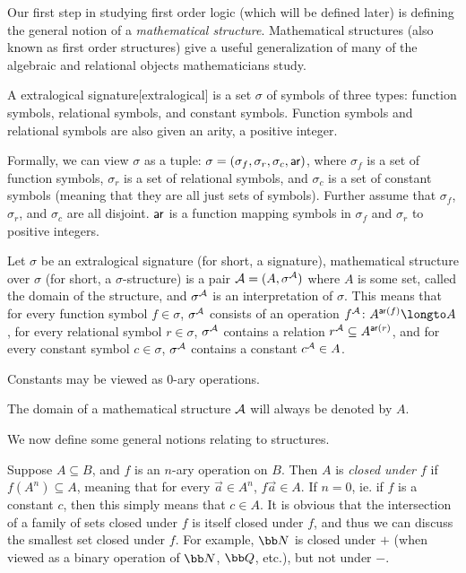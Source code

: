 Our first step in studying first order logic (which will be defined later) is defining the general notion of a {\it mathematical structure}.
Mathematical structures (also known as first order structures) give a useful generalization of many of the algebraic and relational objects mathematicians study.

\bdefn

    A {\emphcolor extralogical signature}[extralogical] is a set $\sigma$ of symbols of three types: function symbols, relational symbols, and constant symbols.
    Function symbols and relational symbols are also given an {\emphcolor arity}, a positive integer.

    Formally, we can view $\sigma$ as a tuple: $\sigma=(\sigma_f,\sigma_r,\sigma_c,{\sf ar})$, where $\sigma_f$ is a set of function symbols, $\sigma_r$ is a set of relational symbols, and $\sigma_c$ is a
    set of constant symbols (meaning that they are all just sets of symbols).
    Further assume that $\sigma_f$, $\sigma_r$, and $\sigma_c$ are all disjoint.
    ${\sf ar}$ is a function mapping symbols in $\sigma_f$ and $\sigma_r$ to positive integers.

\edefn

\bdefn

    Let $\sigma$ be an extralogical signature (for short, a signature), {\emphcolor mathematical structure} over $\sigma$ (for short, a $\sigma$-structure) is a pair
    ${\cal A}=(A,\sigma^{\cal A})$ where $A$ is some set, called the {\emphcolor domain} of the structure, and $\sigma^{\cal A}$ is an {\emphcolor interpretation} of $\sigma$.
    This means that for every function symbol $f\in\sigma$, $\sigma^{\cal A}$ consists of an operation $f^{\cal A}\colon A^{{\sf ar}(f)}\longto A$, for every relational symbol $r\in\sigma$, $\sigma^{\cal A}$
    contains a relation $r^{\cal A}\subseteq A^{{\sf ar}(r)}$, and for every constant symbol $c\in\sigma$, $\sigma^{\cal A}$ contains a constant $c^{\cal A}\in A$.

    Constants may be viewed as $0$-ary operations.

    The domain of a mathematical structure ${\cal A}$ will always be denoted by $A$.

\edefn

We now define some general notions relating to structures.

Suppose $A\subseteq B$, and $f$ is an $n$-ary operation on $B$.
Then $A$ is {\it closed under $f$} if $f(A^n)\subseteq A$, meaning that for every $\vec a\in A^n$, $f\vec a\in A$.
If $n=0$, ie. if $f$ is a constant $c$, then this simply means that $c\in A$.
It is obvious that the intersection of a family of sets closed under $f$ is itself closed under $f$, and thus we can discuss the smallest set closed under $f$.
For example, ${\bb N}$ is closed under $+$ (when viewed as a binary operation of ${\bb N}$, ${\bb Q}$, etc.), but not under $-$.

